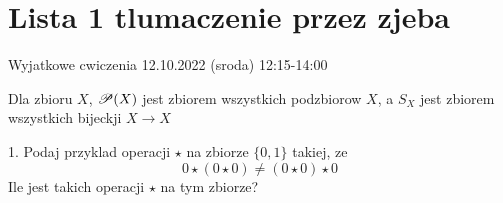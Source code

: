 \documentclass{article}[13pt]
\begin{document}
    \section*{Lista 1 tlumaczenie przez zjeba}

    Wyjatkowe cwiczenia 12.10.2022 (sroda) 12:15-14:00\bigskip

    Dla zbioru $X$, $\mathcal{P}(X)$ jest zbiorem wszystkich podzbiorow $X$, a $S_X$ jest zbiorem wszystkich bijeckji $X\to X$\medskip

    1. Podaj przyklad operacji $\star$ na zbiorze $\{0,1\}$ takiej, ze
    $$0\star(0\star0)\neq(0\star0)\star0$$
    Ile jest takich operacji $\star$ na tym zbiorze?
\end{document}
